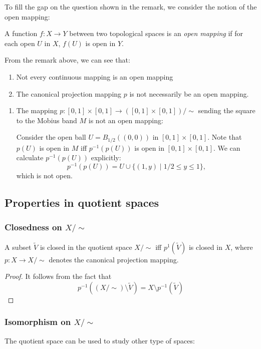 To fill the gap on the question shown in the remark, we consider the notion of the open mapping:
\begin{definition}
A function $f:X\to Y$ between two topological spaces is an \emph{open mapping} if for each open $U$ in $X$, $f(U)$ is open in $Y$.
\end{definition}
\begin{remark}
From the remark above, we can see that:
\begin{enumerate}
\item
Not every continuous mapping is an open mapping
\item
The canonical projection mapping $p$ is not necessarily be an open mapping.
\end{enumerate}
\end{remark}

\begin{example}\label{exp:6:4}
\begin{enumerate}
\item
The mapping $p:[0,1]\times[0,1]\to([0,1]\times[0,1])/\sim$ sending the square to the Mobius band $M$ is not an open mapping:

Consider the open ball $U=B_{1/2}((0,0))$ in $[0,1]\times[0,1]$.
Note that $p(U)$ is open in $M$ iff $p^{-1}(p(U))$ is open in $[0,1]\times[0,1]$.
We can calculate $p^{-1}(p(U))$ explicitly:
\[
p^{-1}(p(U)) = U\cup\{(1,y)\mid 1/2\le y\le 1\},
\]
which is not open.
\end{enumerate}
\end{example}

\subsection{Properties in quotient spaces}
\subsubsection{Closedness on $X/\sim$}
\begin{proposition}
A subset $\tilde{V}$ is closed in the quotient space $X/\sim$ iff $p^{1}(\tilde{V})$  is closed in $X$, where $p:X\to X/\sim$ denotes the canonical projection mapping.
\end{proposition}
\begin{proof}
It follows from the fact that
\[
p^{-1}\left((X/\sim)\setminus \tilde{V}\right)
=
X\setminus p^{-1}(\tilde{V})
\]
\end{proof}


\subsubsection{Isomorphism on $X/\sim$}
The quotient space can be used to study other type of spaces:

